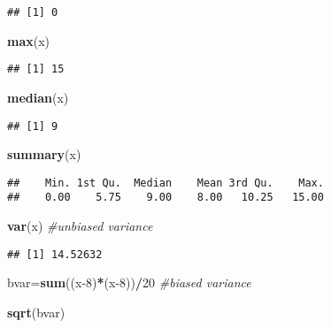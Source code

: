 \documentclass[]{article}
\newenvironment{Shaded}{\begin{snugshade}}{\end{snugshade}}
\newcommand{\CommentTok}[1]{\textcolor[rgb]{0.56,0.35,0.01}{\textit{#1}}}
\newcommand{\DecValTok}[1]{\textcolor[rgb]{0.00,0.00,0.81}{#1}}
\newcommand{\KeywordTok}[1]{\textcolor[rgb]{0.13,0.29,0.53}{\textbf{#1}}}
\newcommand{\NormalTok}[1]{#1}
\newcommand{\OperatorTok}[1]{\textcolor[rgb]{0.81,0.36,0.00}{\textbf{#1}}}
\begin{document}
\begin{verbatim}
## [1] 0
\end{verbatim}

\begin{Shaded}
\begin{Highlighting}[]
\KeywordTok{max}\NormalTok{(x)}
\end{Highlighting}
\end{Shaded}

\begin{verbatim}
## [1] 15
\end{verbatim}

\begin{Shaded}
\begin{Highlighting}[]
\KeywordTok{median}\NormalTok{(x)}
\end{Highlighting}
\end{Shaded}

\begin{verbatim}
## [1] 9
\end{verbatim}

\begin{Shaded}
\begin{Highlighting}[]
\KeywordTok{summary}\NormalTok{(x)}
\end{Highlighting}
\end{Shaded}

\begin{verbatim}
##    Min. 1st Qu.  Median    Mean 3rd Qu.    Max. 
##    0.00    5.75    9.00    8.00   10.25   15.00
\end{verbatim}

\begin{Shaded}
\begin{Highlighting}[]
\KeywordTok{var}\NormalTok{(x) }\CommentTok{#unbiased variance }
\end{Highlighting}
\end{Shaded}

\begin{verbatim}
## [1] 14.52632
\end{verbatim}

\begin{Shaded}
\begin{Highlighting}[]
\NormalTok{bvar=}\KeywordTok{sum}\NormalTok{((x}\DecValTok{-8}\NormalTok{)}\OperatorTok{*}\NormalTok{(x}\DecValTok{-8}\NormalTok{))}\OperatorTok{/}\DecValTok{20} \CommentTok{#biased variance }

\KeywordTok{sqrt}\NormalTok{(bvar)}
\end{Highlighting}
\end{Shaded}
\end{document}
